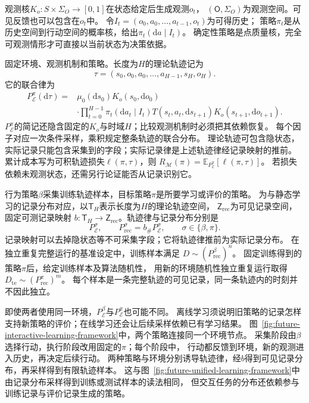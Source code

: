 观测核$K_o:S\times\Sigma_O\to[0,1]$在状态给定后生成观测$o_t$，
$(\mathsf O,\Sigma_O)$为观测空间。可见反馈也可以包含在$o_t$中。
令$I_t=(o_0,a_0,\ldots,a_{t-1},o_t)$为可得历史；
策略$\pi_t$是从历史空间到行动空间的概率核，给出$\pi_t(\mathrm da\mid I_t)$。
确定性策略是点质量核，完全可观测情形才可直接以当前状态为决策依据。

固定环境、观测机制和策略。长度为$H$的理论轨迹记为
\[
  \tau=(s_0,o_0,a_0,\ldots,a_{H-1},s_H,o_H).
\]
它的联合律为
\begin{equation}
  \begin{aligned}
    P_{\mathcal E}^{\pi}(\mathrm d\tau)
    ={}&\mu_0(\mathrm ds_0)K_o(s_0,\mathrm do_0)\\
      &\cdot\prod_{t=0}^{H-1}
      \pi_t(\mathrm da_t\mid I_t)
      T(s_t,a_t,\mathrm ds_{t+1})K_o(s_{t+1},\mathrm do_{t+1}).
  \end{aligned}
  \label{eq:future-interactive-trajectory-law}
\end{equation}
$P_{\mathcal E}^{\pi}$的简记还隐含固定的$K_o$与时域$H$；比较观测机制时必须把其依赖恢复。
每个因子对应一次条件采样，乘积规定整条轨迹的联合分布。
理论轨迹可包含隐状态，实际记录只能包含采集到的字段；实际记录律是上述轨迹律经记录映射的推前。
累计成本写为可积轨迹损失$\ell(\pi,\tau)$，则
$R_{\mathcal M}(\pi)=\mathbb E_{P_{\mathcal E}^{\pi}}[\ell(\pi,\tau)]$。
若损失依赖未观测状态，还需另行论证能否从记录识别它。

行为策略$\beta$采集训练轨迹样本，目标策略$\pi$是所要学习或评价的策略。
为与静态学习的记录分布对应，以$\mathsf T_H$表示长度为$H$的理论轨迹空间，
$\mathsf Z_{\mathrm{rec}}$为可见记录空间，固定可测记录映射
$b:\mathsf T_H\to\mathsf Z_{\mathrm{rec}}$。轨迹律与记录分布分别是
\[
  P_{\mathcal E}^{\sigma},\qquad
  P_{\mathrm{rec}}^{\sigma}=b_{\#}P_{\mathcal E}^{\sigma},
  \qquad \sigma\in\{\beta,\pi\}.
\]
记录映射可以去掉隐状态等不可采集字段；它将轨迹律推前为实际记录分布。
在独立重复完整运行的基准设定中，训练样本满足
$D\sim(P_{\mathrm{rec}}^{\beta})^n$。
固定训练得到的策略$\pi$后，给定训练样本及算法随机性，
用新的环境随机性独立重复运行取得$D_{\mathrm{te}}\sim(P_{\mathrm{rec}}^{\pi})^m$。
每个样本是一条完整轨迹的可见记录，同一条轨迹内的时刻并不因此独立。

即使两者使用同一环境，$P_{\mathcal E}^{\beta}$与$P_{\mathcal E}^{\pi}$也可能不同。
离线学习须说明旧策略的记录怎样支持新策略的评价；在线学习还会让后续采样依赖已有学习结果。
图~\ref{fig:future-interactive-learning-framework}中，两个策略连接同一个环境节点。
采集阶段由$\beta$选择行动，执行阶段改用固定的$\pi$；每个阶段中，
行动都反馈到环境，新的观测进入历史，再决定后续行动。
两种策略与环境分别诱导轨迹律，经$b$得到可见记录分布，再采样得到有限轨迹样本。
这与图~\ref{fig:future-unified-learning-framework}中由记录分布采样得到训练或测试样本的读法相同，
但交互任务的分布还依赖参与训练记录与评价记录生成的策略。

